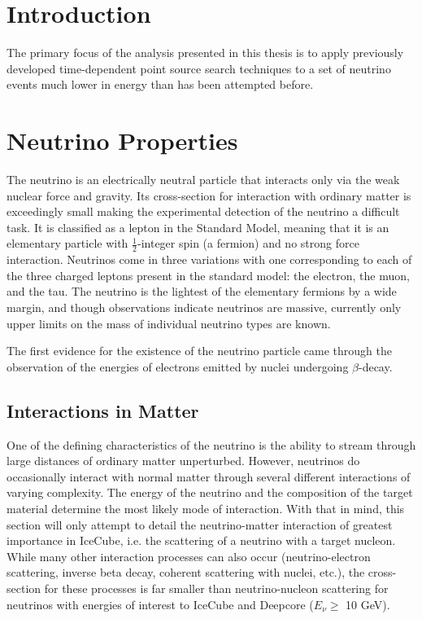 \documentclass{gatech-thesis}
\begin{document}
\chapter{Introduction}


The primary focus of the analysis presented in this thesis is to apply previously developed time-dependent point source search techniques to a set of neutrino events much lower in energy than has been attempted before.

\chapter{Neutrino Properties}
The neutrino is an electrically neutral particle that interacts only via the weak nuclear force and gravity. Its cross-section for interaction with ordinary matter is exceedingly small making the experimental detection of the neutrino a difficult task. It is classified as a lepton in the Standard Model, meaning that it is an elementary particle with $\frac{1}{2}$-integer spin (a fermion) and no strong force interaction. Neutrinos come in three variations with one corresponding to each of the three charged leptons present in the standard model: the electron, the muon, and the tau. The neutrino is the lightest of the  elementary fermions by a wide margin, and though observations indicate neutrinos are massive, currently only upper limits on the mass of individual neutrino types are known.

The first evidence for the existence of the neutrino particle came through the observation of the energies of electrons emitted by nuclei undergoing $\beta$-decay. 

\section{Interactions in Matter}
One of the defining characteristics of the neutrino is the ability to stream through large distances of ordinary matter unperturbed. However, neutrinos do occasionally interact with normal matter through several different interactions of varying complexity. The energy of the neutrino and the composition of the target material determine the most likely mode of interaction. With that in mind, this section will only attempt to detail the neutrino-matter interaction of greatest importance in IceCube, i.e. the scattering of a neutrino with a target nucleon. While many other interaction processes can also occur (neutrino-electron scattering, inverse beta decay, coherent scattering with nuclei, etc.), the cross-section for these processes is far smaller than neutrino-nucleon scattering for neutrinos with energies of interest to IceCube and Deepcore ($E_{\nu} \geq$ 10 GeV).
\end{document}
